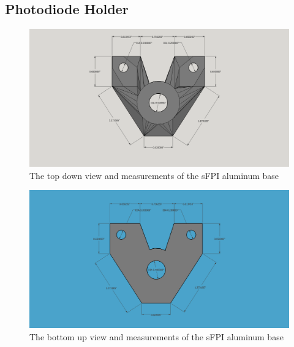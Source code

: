 \documentclass[12pt,journal]{IEEEtran}
\begin{document}
\begin{appendices}
\newpage

\subsection{Photodiode Holder} \label{ss:diode_holder}

\begin{figure}[h!]
  \centering
	\includegraphics[width=\textwidth]{./mechanical/diode_holder_top.png}
	\caption[Cavity Mounts]{The top down view and measurements of the sFPI aluminum base}
	\label{fig:diode_holder-top}
\end{figure}  

\begin{figure}[h!]
  \centering
	\includegraphics[width=\textwidth]{./mechanical/diode_holder_bottom.png}
	\caption[Cavity Mounts]{The bottom up view and measurements of the sFPI aluminum base}
	\label{fig:diode_holder-bottom}
\end{figure}  


\end{appendices}
\end{document}
